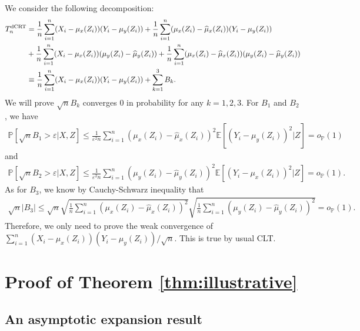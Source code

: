 \documentclass[12pt]{article}
\theoremstyle{definition}
\def\P{\mathbb{P}}
\def\P{\mathbb{P}}
\newcommand{\E}{\mathbb E}								%
\renewcommand{\P}{\mathbb{P}}							%
\newcommand{\srx}{X}									%
\newcommand{\srz}{Z}									%
\newcommand{\sry}{Y}									%
\newcommand{\dCRT}{\textnormal{dCRT}} 					%
\begin{document}
We consider the following decomposition:
\begin{align*}
  T_n^{\dCRT}
  &
  =\frac{1}{n}\sum_{i=1}^n (\srx_i-\mu_x(\srz_i))(\sry_i-\mu_y(\srz_i)) + \frac{1}{n}\sum_{i=1}^n (\mu_{x}(\srz_i)-\widehat{\mu}_{x}(\srz_i))(\sry_i-\mu_{y}(\srz_i))\\
  &
  + \frac{1}{n}\sum_{i=1}^n (\srx_i-\mu_{x}(\srz_i))(\mu_{y}(\srz_i)-\widehat{\mu}_{y}(\srz_i))+\frac{1}{n}\sum_{i=1}^n (\mu_{x}(\srz_i)-\widehat{\mu}_{x}(\srz_i))(\mu_{y}(\srz_i)-\widehat{\mu}_{y}(\srz_i))\\
  &
  \equiv \frac{1}{n}\sum_{i=1}^n (\srx_i-\mu_x(\srz_i))(\sry_i-\mu_y(\srz_i))+\sum_{k=1}^3B_k.
\end{align*}
We will prove $\sqrt{n}B_k$ converges $0$ in probability for any $k=1,2,3$. For $B_1$ and $B_2$, we have 
\begin{align*}
  \P\left[\sqrt{n}B_1>\varepsilon|\srx,\srz\right]\leq \frac{1}{\varepsilon^2n}\sum_{i=1}^n (\mu_{x}(\srz_i)-\widehat{\mu}_{x}(\srz_i))^2\E[(\sry_i-\mu_{y}(\srz_i))^2|\srz]=o_{\P}(1)
\end{align*}
and 
\begin{align*}
  \P\left[\sqrt{n}B_2>\varepsilon|\srx,\srz\right]\leq \frac{1}{\varepsilon^2n}\sum_{i=1}^n (\mu_{y}(\srz_i)-\widehat{\mu}_{y}(\srz_i))^2\E[(\sry_i-\mu_{x}(\srz_i))^2|\srz]=o_{\P}(1).
\end{align*}
As for $B_3$, we know by Cauchy-Schwarz inequality that
\begin{align*}
  \sqrt{n}|B_3|\leq \sqrt{n}\sqrt{\frac{1}{n}\sum_{i=1}^n (\mu_{x}(\srz_i)-\widehat{\mu}_{x}(\srz_i))^2}\sqrt{\frac{1}{n}\sum_{i=1}^n (\mu_{y}(\srz_i)-\widehat{\mu}_{y}(\srz_i))^2}=o_{\P}(1).
\end{align*}
Therefore, we only need to prove the weak convergence of $\sum_{i=1}^n (\srx_i-\mu_x(\srz_i))(\sry_i-\mu_y(\srz_i))/\sqrt{n}$. This is true by usual CLT.

\section{Proof of Theorem \ref{thm:illustrative}}

\subsection{An asymptotic expansion result}
\end{document}
